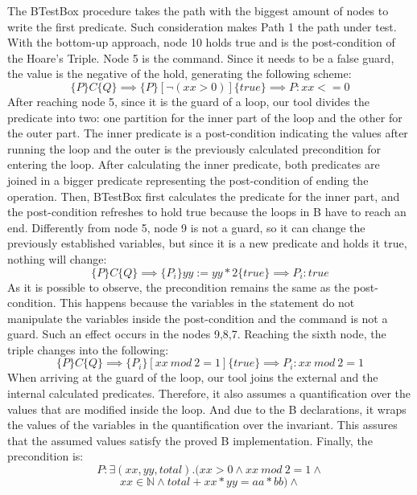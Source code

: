 \documentclass[runningheads]{llncs}
\begin{document}
The BTestBox procedure takes the path with the biggest amount of nodes to write the first predicate. Such consideration makes Path 1 the path under test. With the bottom-up approach, node 10 holds true and is the post-condition of the Hoare's Triple. Node 5 is the command. Since it needs to be a false guard, the value is the negative of the hold, generating the following scheme:
\nolinebreak[4] $$\{P\} C \{Q\} \implies \{P\} [\neg(xx > 0)] \{true\} \implies P: xx <= 0$$ \nolinebreak[4] After reaching node 5, since it is the guard of a loop, our tool divides the predicate into two: one partition for the inner part of the loop and the other for the outer part. The inner predicate is a post-condition indicating the values after running the loop and the outer is the previously calculated precondition for entering the loop. After calculating the inner predicate, both predicates are joined in a bigger predicate representing the post-condition of ending the operation. Then, BTestBox first calculates the predicate for the inner part, and the post-condition refreshes to hold true because the loops in B have to reach an end. Differently from node 5, node 9 is not a guard, so it can change the previously established variables, but since it is a new predicate and holds it true, nothing will change: \nolinebreak[4] $$\{P\} C \{Q\} \implies \{P_i\} yy := yy * 2\{true\} \implies P_i: true$$ \nolinebreak[4]
As it is possible to observe, the precondition remains the same as the post-condition. This happens because the variables in the statement do not manipulate the variables inside the post-condition and the command is not a guard. Such an effect occurs in the nodes 9,8,7. Reaching the sixth node, the triple changes into the following: \nolinebreak[4] $$\{P\} C \{Q\} \implies \{P_i\} [xx\ mod\ 2=1]\{true\} \implies P_i: xx\ mod\ 2 = 1$$ \nolinebreak[4]
When arriving at the guard of the loop, our tool joins the external and the internal calculated predicates. Therefore, it also assumes a quantification over the values that are modified inside the loop. And due to the B declarations, it wraps the values of the variables in the quantification over the invariant. This assures that the assumed values satisfy the proved B implementation. Finally, the precondition is: \nolinebreak[4]
$$P: \exists(xx, yy, total).(xx > 0 \wedge xx\ mod\ 2 = 1 \wedge$$
$$ xx \in \mathbb{N} \wedge total + xx * yy = aa * bb) \wedge$$
\end{document}
